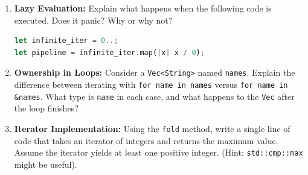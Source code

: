 \begin{enumerate}
    \item \textbf{Lazy Evaluation:} Explain what happens when the following code is executed. Does it panic? Why or why not?
\begin{lstlisting}[language=Rust]
let infinite_iter = 0..;
let pipeline = infinite_iter.map(|x| x / 0);
\end{lstlisting}

    \item \textbf{Ownership in Loops:} Consider a \texttt{Vec<String>} named \texttt{names}. Explain the difference between iterating with \texttt{for name in names} versus \texttt{for name in \&names}. What type is \texttt{name} in each case, and what happens to the \texttt{Vec} after the loop finishes?

    \item \textbf{Iterator Implementation:} Using the \texttt{fold} method, write a single line of code that takes an iterator of integers and returns the maximum value. Assume the iterator yields at least one positive integer. (Hint: \texttt{std::cmp::max} might be useful).
\end{enumerate}
